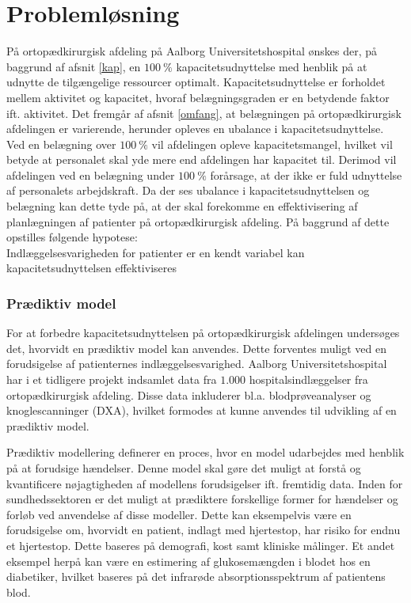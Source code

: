 \chapter{Problemløsning}
På ortopædkirurgisk afdeling på Aalborg Universitetshospital ønskes der, på baggrund af afsnit \ref{kap}, en $100~\%$ kapacitetsudnyttelse med henblik på at udnytte de tilgængelige ressourcer optimalt. Kapacitetsudnyttelse er forholdet mellem aktivitet og kapacitet, hvoraf belægningsgraden er en betydende faktor ift. aktivitet. Det fremgår af afsnit \ref{omfang}, at belægningen på ortopædkirurgisk afdelingen er varierende, herunder opleves en ubalance i kapacitetsudnyttelse. Ved en belægning over $100~\%$ vil afdelingen opleve kapacitetsmangel, hvilket vil betyde at personalet skal yde mere end afdelingen har kapacitet til. Derimod vil afdelingen ved en belægning under $100~\%$ forårsage, at der ikke er fuld udnyttelse af personalets arbejdskraft. Da der ses ubalance i kapacitetsudnyttelsen og belægning kan dette tyde på, at der skal forekomme en effektivisering af planlægningen af patienter på ortopædkirurgisk afdeling. På baggrund af dette opstilles følgende hypotese:\\

\noindent
Indlæggelsesvarigheden for patienter er en kendt variabel kan kapacitetsudnyttelsen effektiviseres

\subsection{Prædiktiv model}
For at forbedre kapacitetsudnyttelsen på ortopædkirurgisk afdelingen undersøges det, hvorvidt en prædiktiv model kan anvendes.
Dette forventes muligt ved en forudsigelse af patienternes indlæggelsesvarighed. Aalborg Universitetshospital har i et tidligere projekt indsamlet data fra $1.000$ hospitalsindlæggelser fra ortopædkirurgisk afdeling. Disse data inkluderer bl.a. blodprøveanalyser og knoglescanninger (DXA), hvilket formodes at kunne anvendes til udvikling af en prædiktiv model. 

\noindent
Prædiktiv modellering definerer en proces, hvor en model udarbejdes med henblik på at forudsige hændelser. Denne model skal gøre det muligt at forstå og kvantificere nøjagtigheden af modellens forudsigelser ift. fremtidig data.\cite{Kuhn2013} 
Inden for sundhedssektoren er det muligt at prædiktere forskellige former for hændelser og forløb ved anvendelse af disse modeller. Dette kan eksempelvis være en forudsigelse om, hvorvidt en patient, indlagt med hjertestop, har risiko for endnu et hjertestop. Dette baseres på demografi, kost samt kliniske målinger. Et andet eksempel herpå kan være en estimering af glukosemængden i blodet hos en diabetiker, hvilket baseres på det infrarøde absorptionsspektrum af patientens blod.\cite{Hastie2008}

